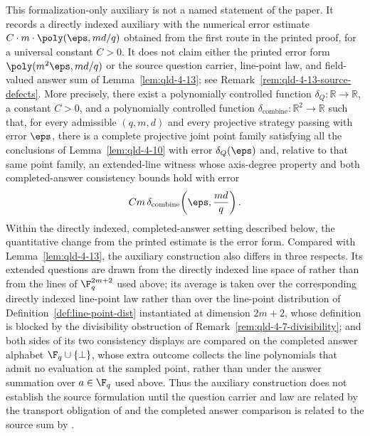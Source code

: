 \begin{lemma}
	\label{lem:qld-4-13-established}
	\leanok
	This formalization-only auxiliary is not a named statement of the paper.
	It records a directly indexed auxiliary with the numerical error estimate
	$C \cdot m \cdot \poly(\eps, md/q)$ obtained from the first route in the
	printed proof, for a universal constant $C > 0$. It does not claim either
	the printed error form $\poly(m^2\eps, md/q)$ or the source question carrier,
	line-point law, and field-valued answer sum of Lemma~\ref{lem:qld-4-13}; see
	Remark~\ref{rem:qld-4-13-source-defects}.
	More precisely, there exist a polynomially controlled function
	$\delta_Q:\mathbb R\to\mathbb R$, a constant $C>0$, and a polynomially
	controlled function
	$\delta_{\mathrm{combine}}:\mathbb R^2\to\mathbb R$ such that, for every admissible
	$(q,m,d)$ and every projective strategy passing with error $\eps$, there is a
	complete projective joint point family satisfying all the conclusions of
	Lemma~\ref{lem:qld-4-10} with error $\delta_Q(\eps)$ and, relative to that
	same point family, an extended-line witness whose axis-degree property and
	both completed-answer consistency bounds hold with error
	\[
		C m\,\delta_{\mathrm{combine}}\!\left(\eps,\frac{md}{q}\right).
	\]
	Within the directly indexed, completed-answer setting described below, the
	quantitative change from the printed estimate is the error form. Compared
	with Lemma~\ref{lem:qld-4-13}, the auxiliary construction also differs in
	three respects. Its extended questions are
	drawn from the directly indexed line space of
	\cite{gap:qpbt_ld-dimension-divisibility} rather than from the lines of
	$\F_q^{2m+2}$ used above; its average is taken over the corresponding
	directly indexed line-point law rather than over the line-point
	distribution of Definition~\ref{def:line-point-dist} instantiated at
	dimension $2m+2$, whose definition is blocked by the divisibility
	obstruction of Remark~\ref{rem:qld-4-7-divisibility}; and both sides of
	its two consistency displays are compared on the completed answer
	alphabet $\F_q \cup \{\bot\}$, whose extra outcome collects the line
	polynomials that admit no evaluation at the sampled point, rather than
	under the answer summation over $a \in \F_q$ used above. Thus the auxiliary
	construction does not establish the source formulation until the question carrier
	and law are related by the transport obligation of
	\cite{gap:qpbt_ld-dimension-divisibility} and the completed answer comparison
	is related to the source sum by
	\cite{gap:qpbt_combined-lines-error-term}.
\end{lemma}
